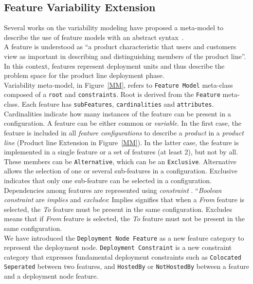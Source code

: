 \documentclass{llncs}
\begin{document}
\subsection{Feature Variability Extension}
Several works on the variability modeling have proposed a meta-model to describe the use of feature models with an abstract syntax~\cite{quinton2014cloud,Parra2011,Pohl2005}.\\
A feature is understood as ``a product characteristic that users and customers view as important in describing and distinguishing members of the product line''\cite{thiel2002systematic}.
In this context, features represent deployment units and thus describe the problem space for the product line deployment phase.\\ Variability meta-model, in Figure~\ref{MM}, refers to \texttt{Feature Model} meta-class composed of a \texttt{root} and \texttt{constraints}. Root is derived from the \texttt{Feature} meta-class. 
Each feature has \texttt{subFeatures}, \texttt{cardinalities} and \texttt{attributes}. Cardinalities indicate how many instances of the feature can be present in a configuration.
A feature can be either common or \emph{variable}. In the first case, the feature is included in all \emph{feature configurations} to describe a \emph{product} in a \emph{product line} (Product line Extension in Figure~\ref{MM}). In the latter case, the feature is implemented in a single feature or a set of features (at least 2), but not by all. These members can be \texttt{Alternative}, which can be an \texttt{Exclusive}. Alternative allows the selection of one or several sub-features in a configuration. Exclusive indicates that only one sub-feature can be selected in a configuration.\\ 
Dependencies among features are represented using \emph{constraint} . ``\emph{Boolean constraint} are \emph{implies} and \emph{excludes}: Implies signifies that when a \emph{From} feature is selected, the \emph{To} feature must be present in the same configuration. Excludes means that if \emph{From} feature is selected, the \emph{To} feature must not be present in the same configuration.\\
We have introduced the \texttt{Deployment Node Feature} as a new feature category to represent the deployment node. \texttt{Deployment Constraint} is a new constraint category that expresses fundamental deployment constraints such as \texttt{Colocated}  \texttt{Seperated} between two features, and \texttt{HostedBy} or \texttt{NotHostedBy} between a feature and a deployment node feature.
\end{document}
